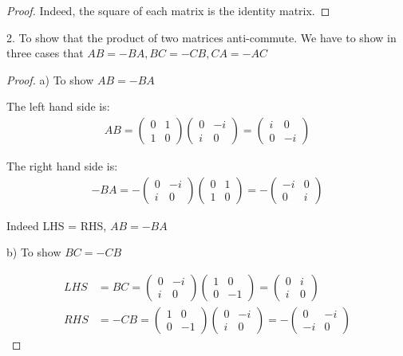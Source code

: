 \documentclass{article}
\begin{document}
\begin{proof}
Indeed, the square of each matrix is the identity matrix.
\end{proof}

2. To show that the product of two matrices anti-commute. We have to show in three cases that $AB = - BA, BC = - CB, CA = - AC$

\begin{proof}
a) To show $AB = - BA$

The left hand side is:
\begin{align}
AB = \begin{pmatrix}
0 & 1 \\ 1 & 0
\end{pmatrix}
\begin{pmatrix}
0 & -i \\ i & 0
\end{pmatrix}
= \begin{pmatrix}
i & 0 \\ 0 & -i
\end{pmatrix}
\end{align}

The right hand side is:
\begin{align}
-BA = -\begin{pmatrix}
0 & -i \\ i & 0
\end{pmatrix}\begin{pmatrix}
0 & 1 \\ 1 & 0
\end{pmatrix}= -\begin{pmatrix}
-i & 0 \\ 0 & i
\end{pmatrix}
\end{align}

Indeed LHS = RHS, $AB = - BA$

b) To show $BC = - CB$

\begin{align}
LHS &= BC = \begin{pmatrix}
0 & -i \\ i & 0
\end{pmatrix}\begin{pmatrix}
1 & 0 \\ 0 & -1
\end{pmatrix} = \begin{pmatrix}
0 & i \\ i & 0
\end{pmatrix} \\ 
RHS &= -CB = \begin{pmatrix}
1 & 0 \\ 0 & -1
\end{pmatrix}\begin{pmatrix}
0 & -i \\ i & 0
\end{pmatrix} = - \begin{pmatrix}
0 & -i \\ -i & 0
\end{pmatrix}
\end{align}


\end{proof}
\end{document}
